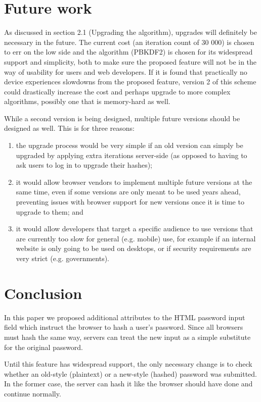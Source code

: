 \documentclass{paper}
\begin{document}
\section{Future work}

As discussed in section 2.1 (Upgrading the algorithm), upgrades will definitely be necessary
in the future. The current cost (an iteration count of 30 000) is chosen to err on the low
side and the algorithm (PBKDF2) is chosen for its widespread support and simplicity, both to
make sure the proposed feature will not be in the way of usability for users and web
developers. If it is found that practically no device experiences slowdowns from the proposed
feature, version 2 of this scheme could drastically increase the cost and perhaps upgrade to
more complex algorithms, possibly one that is memory-hard as well.

While a second version is being designed, multiple future versions should be designed as
well. This is for three reasons:

\begin{enumerate}
\item the upgrade process would be very simple if an old version can simply be upgraded by
applying extra iterations server-side (as opposed to having to ask users to log in to upgrade
their hashes);
\item it would allow browser vendors to implement multiple future versions at the same time,
even if some versions are only meant to be used years ahead, preventing issues with browser
support for new versions once it is time to upgrade to them; and
\item it would allow developers that target a specific audience to use versions that are
currently too slow for general (e.g. mobile) use, for example if an internal website is only
going to be used on desktops, or if security requirements are very strict (e.g. governments).
\end{enumerate}

\section*{Conclusion}

In this paper we proposed additional attributes to the HTML password input field which
instruct the browser to hash a user's password. Since all browsers must hash the same way,
servers can treat the new input as a simple substitute for the original password.

Until this feature has widespread support, the only necessary change is to check whether an
old-style (plaintext) or a new-style (hashed) password was submitted. In the former case, the
server can hash it like the browser should have done and continue normally.
\end{document}
